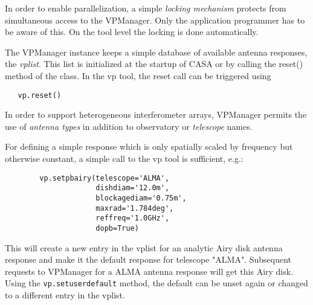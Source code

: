 \documentclass[12pt]{article}
\begin{document}
In order to enable parallelization, a simple {\it locking mechanism} protects from simultaneous access
to the VPManager. Only the application programmer has to be aware of this. On the tool level
the locking is done automatically.

The VPManager instance keeps a simple database of available antenna responses, the {\it vplist}.
This list is initialized at the startup of CASA or by calling the reset() method
of the class. In the vp tool, the reset call can be triggered using
\begin{verbatim}
   vp.reset()
\end{verbatim}

In order to support heterogeneous interferometer arrays, VPManager permits the use
of {\it antenna types} in addition to observatory or {\it telescope} names.

For defining a simple response which is only spatially scaled by frequency but otherwise
constant, a simple call to the vp tool is sufficient, e.g.:
\begin{verbatim}
        vp.setpbairy(telescope='ALMA',
                     dishdiam='12.0m',
                     blockagediam='0.75m',
                     maxrad='1.784deg',
                     reffreq='1.0GHz',
                     dopb=True)
\end{verbatim}
This will create a new entry in the vplist for an analytic Airy disk antenna response
and make it the default response for telescope "ALMA".
Subsequent requests to VPManager for a ALMA antenna response will get this Airy disk.
Using the {\tt vp.setuserdefault} method, the default can be unset again or changed
to a different entry in the vplist.
\end{document}
